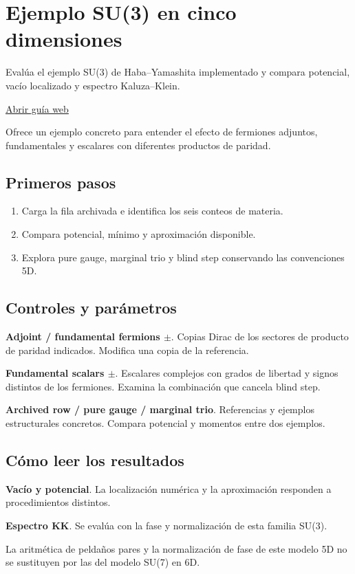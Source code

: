 \documentclass[11pt,a4paper]{article}
\begin{document}
\section{Ejemplo SU(3) en cinco dimensiones}
Evalúa el ejemplo SU(3) de Haba--Yamashita implementado y compara potencial, vacío localizado y espectro Kaluza--Klein.

\href{https://karlesmarin.github.io/ghu-explorer/guide/es/fived/index.html}{Abrir guía web}

Ofrece un ejemplo concreto para entender el efecto de fermiones adjuntos, fundamentales y escalares con diferentes productos de paridad.
\subsection*{Primeros pasos}
\begin{enumerate}
\item Carga la fila archivada e identifica los seis conteos de materia.
\item Compara potencial, mínimo y aproximación disponible.
\item Explora pure gauge, marginal trio y blind step conservando las convenciones 5D.
\end{enumerate}
\subsection*{Controles y parámetros}
\textbf{Adjoint / fundamental fermions \ensuremath{\pm}}. Copias Dirac de los sectores de producto de paridad indicados. Modifica una copia de la referencia.

\textbf{Fundamental scalars \ensuremath{\pm}}. Escalares complejos con grados de libertad y signos distintos de los fermiones. Examina la combinación que cancela blind step.

\textbf{Archived row / pure gauge / marginal trio}. Referencias y ejemplos estructurales concretos. Compara potencial y momentos entre dos ejemplos.

\subsection*{Cómo leer los resultados}
\textbf{Vacío y potencial}. La localización numérica y la aproximación responden a procedimientos distintos.

\textbf{Espectro KK}. Se evalúa con la fase y normalización de esta familia SU(3).

La aritmética de peldaños pares y la normalización de fase de este modelo 5D no se sustituyen por las del modelo SU(7) en 6D.
\end{document}

